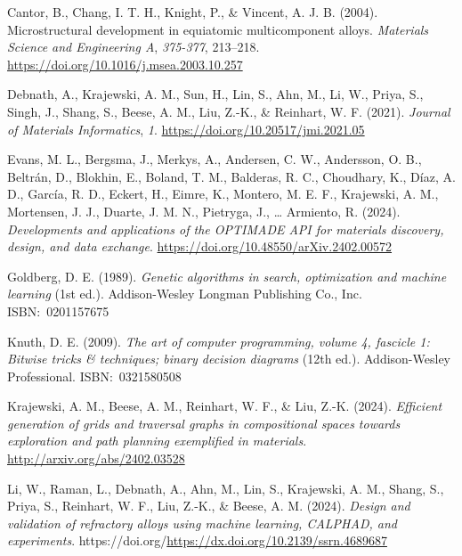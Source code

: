 \documentclass[
]{article}
\newlength{\cslhangindent}
\newlength{\cslentryspacingunit} %
\newenvironment{CSLReferences}[2] %
 {%
  \setlength{\parindent}{0pt}
  \ifodd #1
  \let\oldpar\par
  \def\par{\hangindent=\cslhangindent\oldpar}
  \fi
  \setlength{\parskip}{#2\cslentryspacingunit}
 }%
 {}
\begin{document}
\hypertarget{refs}{}
\begin{CSLReferences}{1}{0}
\leavevmode{}%
Cantor, B., Chang, I. T. H., Knight, P., \& Vincent, A. J. B. (2004).
Microstructural development in equiatomic multicomponent alloys.
\emph{Materials Science and Engineering A}, \emph{375-377}, 213--218.
\url{https://doi.org/10.1016/j.msea.2003.10.257}

\leavevmode{}%
Debnath, A., Krajewski, A. M., Sun, H., Lin, S., Ahn, M., Li, W., Priya,
S., Singh, J., Shang, S., Beese, A. M., Liu, Z.-K., \& Reinhart, W. F.
(2021). \emph{Journal of Materials Informatics}, \emph{1}.
\url{https://doi.org/10.20517/jmi.2021.05}

\leavevmode{}%
Evans, M. L., Bergsma, J., Merkys, A., Andersen, C. W., Andersson, O.
B., Beltrán, D., Blokhin, E., Boland, T. M., Balderas, R. C., Choudhary,
K., Díaz, A. D., García, R. D., Eckert, H., Eimre, K., Montero, M. E.
F., Krajewski, A. M., Mortensen, J. J., Duarte, J. M. N., Pietryga, J.,
\ldots{} Armiento, R. (2024). \emph{Developments and applications of the
OPTIMADE API for materials discovery, design, and data exchange}.
\url{https://doi.org/10.48550/arXiv.2402.00572}

\leavevmode{}%
Goldberg, D. E. (1989). \emph{Genetic algorithms in search, optimization
and machine learning} (1st ed.). Addison-Wesley Longman Publishing Co.,
Inc. ISBN:~0201157675

\leavevmode{}%
Knuth, D. E. (2009). \emph{The art of computer programming, volume 4,
fascicle 1: Bitwise tricks \& techniques; binary decision diagrams}
(12th ed.). Addison-Wesley Professional. ISBN:~0321580508

\leavevmode{}%
Krajewski, A. M., Beese, A. M., Reinhart, W. F., \& Liu, Z.-K. (2024).
\emph{Efficient generation of grids and traversal graphs in
compositional spaces towards exploration and path planning exemplified
in materials}. \url{http://arxiv.org/abs/2402.03528}

\leavevmode{}%
Li, W., Raman, L., Debnath, A., Ahn, M., Lin, S., Krajewski, A. M.,
Shang, S., Priya, S., Reinhart, W. F., Liu, Z.-K., \& Beese, A. M.
(2024). \emph{Design and validation of refractory alloys using machine
learning, CALPHAD, and experiments}.
https://doi.org/\url{https://dx.doi.org/10.2139/ssrn.4689687}


\end{CSLReferences}
\end{document}
